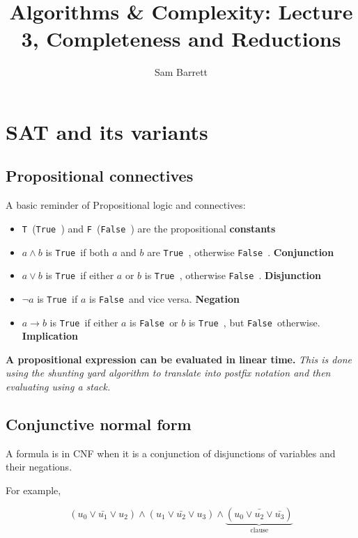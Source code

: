 \documentclass{article}
\title{Algorithms \& Complexity: Lecture 3, Completeness and Reductions}
\author{Sam Barrett}
\newcommand{\T}{\texttt{T }}
\newcommand{\True}{\texttt{True }}
\newcommand{\F}{\texttt{F }}
\newcommand{\False}{\texttt{False }}
\begin{document}
\maketitle

\section{SAT and its variants}
\label{sec:sat}

\subsection{Propositional connectives}
\label{subsec:proplogic}

A basic reminder of  Propositional logic and connectives:

\begin{itemize}
  \item \T (\True) and \F (\False) are the propositional \textbf{constants}
  \item $a \wedge b$ is \True if both $a$ and $b$ are \True, otherwise \False. \textbf{Conjunction}
  \item $a \vee b$ is \True if either $a$ or $b$ is \True, otherwise \False. \textbf{Disjunction}
  \item $\neg a$ is \True if $a$ is \False and vice versa. \textbf{Negation}
  \item $a \rightarrow b$ is \True if either $a$ is \False or $b$ is \True, but \False otherwise. \textbf{Implication}
\end{itemize}

\begin{lemma}\label{lemma:prop-logic}
  \textbf{A propositional expression can be evaluated in linear time.} \textit{This is done using the \textit{shunting yard} algorithm to translate into postfix notation and then evaluating using a stack.}
\end{lemma}

\subsection{Conjunctive normal form}
\label{subsec:cnf}

A formula is in CNF when it is a conjunction of disjunctions of variables and their negations.

For example,

\[
  (u_{0}\vee \bar{u_{1}} \vee u_{2}) \wedge (u_{1}\vee \bar{u_{2}} \vee u_{3}) \wedge \underbrace{(\bar{u_{0}\vee u_{2} \vee \bar{u_{3}}})}_{\text{clause}}
\]
\end{document}
